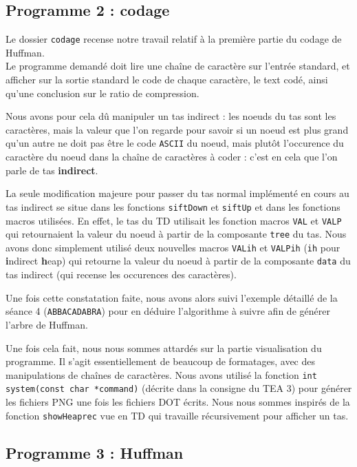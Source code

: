 \documentclass[11pt]{article}
\begin{document}
\subsection{Programme 2 : codage}

\quad \quad Le dossier \texttt{codage} recense notre travail relatif à la première partie du codage de Huffman. \\

Le programme demandé doit lire une chaîne de caractère sur l'entrée standard, et afficher sur la sortie standard le code de chaque caractère, le text codé, ainsi qu'une conclusion sur le ratio de compression.

Nous avons pour cela dû manipuler un tas indirect : les noeuds du tas sont les caractères, mais la valeur que l'on regarde pour savoir si un noeud est plus grand qu'un autre ne doit pas être le code \texttt{ASCII} du noeud, mais plutôt l'occurence du caractère du noeud dans la chaîne de caractères à coder : c'est en cela que l'on parle de tas \textbf{indirect}.

La seule modification majeure pour passer du tas normal implémenté en cours au tas indirect se situe dans les fonctions \texttt{siftDown} et \texttt{siftUp} et dans les fonctions macros utilisées. En effet, le tas du TD utilisait les fonction macros \texttt{VAL} et \texttt{VALP} qui retournaient la valeur du noeud à partir de la composante \texttt{tree} du tas. Nous avons donc simplement utilisé deux nouvelles macros \texttt{VAL\textunderscore ih} et \texttt{VALP\textunderscore ih} (\texttt{ih} pour \textbf{i}ndirect \textbf{h}eap) qui retourne la valeur du noeud à partir de la composante \texttt{data} du tas indirect (qui recense les occurences des caractères).

Une fois cette constatation faite, nous avons alors suivi l'exemple détaillé de la séance 4 (\texttt{ABBACADABRA}) pour en déduire l'algorithme à suivre afin de générer l'arbre de Huffman.

Une fois cela fait, nous nous sommes attardés sur la partie visualisation du programme. Il s'agit essentiellement de beaucoup de formatages, avec des manipulations de chaînes de caractères. Nous avons utilisé la fonction \texttt{int system(const char *command)} (décrite dans la consigne du TEA 3) pour générer les fichiers \textsc{PNG} une fois les fichiers \textsc{DOT} écrits. Nous nous sommes inspirés de la fonction \texttt{showHeap\textunderscore rec} vue en TD qui travaille récursivement pour afficher un tas.

\subsection{Programme 3 : Huffman}
\end{document}
